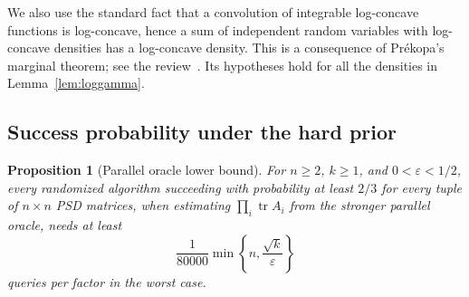 \documentclass[11pt]{article}
\newtheorem{proposition}[theorem]{Proposition}
\theoremstyle{definition}\newtheorem{definition}[theorem]{Definition}
\theoremstyle{remark}\newtheorem{remark}[theorem]{Remark}
\newcommand{\tr}{\operatorname{tr}}\newcommand{\rank}{\operatorname{rank}}
\newcommand{\eps}{\varepsilon}\newcommand{\Qprod}{Q_{\mathrm{prod}}}
\begin{document}
We also use the standard fact that a convolution of integrable log-concave
functions is log-concave, hence a sum of independent random variables with
log-concave densities has a log-concave density. This is a consequence of
Pr\'ekopa's marginal theorem; see the review~\cite{logconcave}. Its hypotheses
hold for all the densities in Lemma~\ref{lem:loggamma}.

\subsection{Success probability under the hard prior}

\begin{proposition}[Parallel oracle lower bound]\label{prop:lower}
For $n\ge2$, $k\ge1$, and $0<\eps<1/2$, every randomized algorithm succeeding
with probability at least $2/3$ for every tuple of $n\times n$ PSD matrices, when
estimating $\prod_i\tr A_i$ from the stronger parallel oracle, needs at least
\[
 \frac1{80000}\min\left\{n,\frac{\sqrt k}{\eps}\right\}
\]
queries per factor in the worst case.
\end{proposition}
\end{document}
